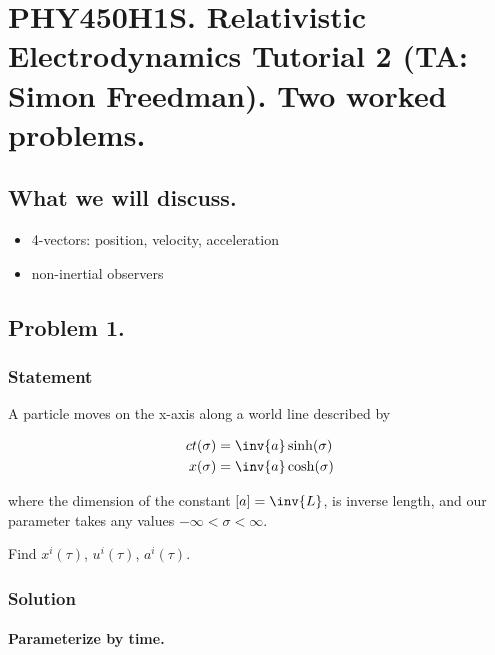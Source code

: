 
%

\chapter{PHY450H1S.  Relativistic Electrodynamics Tutorial 2 (TA: Simon Freedman).  Two worked problems.}
\label{chap:relativisticElectrodynamicsT2}
{}
\date{Jan 27, 2011}

\beginArtWithToc

\section{What we will discuss.}

\begin{itemize}
\item 4-vectors: position, velocity, acceleration
\item non-inertial observers
\end{itemize}

\section{Problem 1.}

\subsection{Statement}
A particle moves on the x-axis along a world line described by

\begin{align}\label{eqn:relativisticElectrodynamicsT2:10}
ct(\sigma) &= \inv{a} \sinh(\sigma) \\
x(\sigma) &= \inv{a} \cosh(\sigma)
\end{align}

where the dimension of the constant $[a] = \inv{L}$, is inverse length, and our parameter takes any values $-\infty < \sigma < \infty$.

Find $x^i(\tau)$, $u^i(\tau)$, $a^i(\tau)$.

\subsection{Solution}

\subsubsection{Parameterize by time.}

